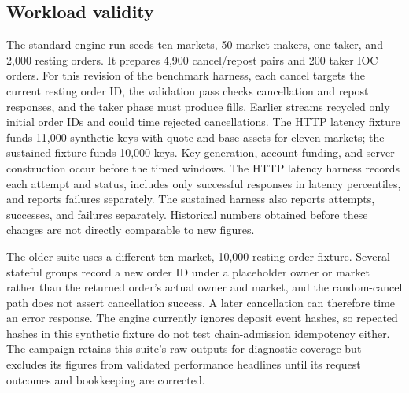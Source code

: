 \documentclass[envcountsame,runningheads,notitlepage]{llncs}
\newcommand{\pathref}[1]{\texttt{\detokenize{#1}}}
\begin{document}
\subsection{Workload validity}
The standard engine run seeds ten markets, 50 market makers, one taker, and 2,000 resting orders. It prepares 4,900 cancel/repost pairs and 200 taker IOC orders. For this revision of the benchmark harness, each cancel targets the current resting order ID, the validation pass checks cancellation and repost responses, and the taker phase must produce fills. Earlier streams recycled only initial order IDs and could time rejected cancellations. The HTTP latency fixture funds 11,000 synthetic keys with quote and base assets for eleven markets; the sustained fixture funds 10,000 keys. Key generation, account funding, and server construction occur before the timed windows. The HTTP latency harness records each attempt and status, includes only successful responses in latency percentiles, and reports failures separately. The sustained harness also reports attempts, successes, and failures separately. Historical numbers obtained before these changes are not directly comparable to new figures.\cite{source}

The older \pathref{benches/benches/matching.rs} suite uses a different ten-market, 10,000-resting-order fixture. Several stateful groups record a new order ID under a placeholder owner or market rather than the returned order's actual owner and market, and the random-cancel path does not assert cancellation success. A later cancellation can therefore time an error response. The engine currently ignores deposit event hashes, so repeated hashes in this synthetic fixture do not test chain-admission idempotency either. The campaign retains this suite's raw outputs for diagnostic coverage but excludes its figures from validated performance headlines until its request outcomes and bookkeeping are corrected.\cite{source}
\end{document}
